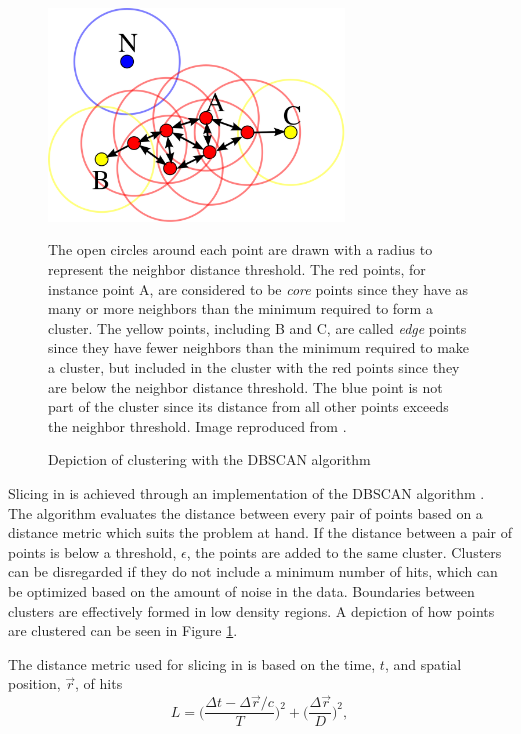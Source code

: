 \begin{figure}[t]
\begin{center}
\includegraphics[width=0.7\textwidth]{figures/figures/dbscan.png}
\end{center}
\caption{Depiction of clustering with the DBSCAN algorithm}{
The open circles around each point are drawn with a radius to represent the
neighbor distance threshold.
The red points, for instance point A, are
considered to be \textit{core} points since they have as many or more neighbors
than the minimum required to form a cluster.  The yellow points, including B
and C, are called
\textit{edge} points since they have fewer neighbors than the minimum required
to make a cluster, but included in the cluster with the red points since they
are below the neighbor distance threshold.  The blue point is not part of the
cluster since its distance from all other points exceeds the neighbor threshold.
Image reproduced from \cite{dbscanWikiCitation}.
}
\label{dbscan}
\end{figure}

Slicing in \nova is achieved through an implementation of the DBSCAN algorithm
\cite{ester1996density,baird2015thesis}.
The algorithm evaluates the distance between every pair of points based on
a distance metric which suits the problem at hand.
If the distance between a pair of points is below a threshold, $\epsilon$, the
points are added to the same cluster.
Clusters can be disregarded if they do not include a minimum number of hits,
which can be optimized based on the amount of noise in the data.
Boundaries between clusters are effectively formed in low density regions.
A depiction of how points are clustered can be seen in Figure \ref{dbscan}.

The distance metric used for slicing in \nova is based on the time, $t$, and
spatial position, $\vec{r}$, of hits
\begin{equation}
L = \bigg( \frac{\Delta t - \Delta \vec{r} / c }{T} \bigg)^2 +
     \bigg( \frac{\Delta \vec{r}}{D} \bigg)^2,
\end{equation}

